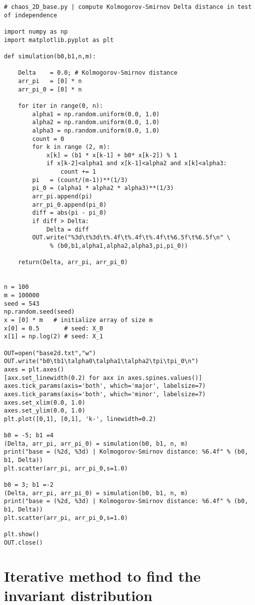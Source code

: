 \documentclass[oneside,10pt]{book}
\begin{document}
\begin{lstlisting}
# chaos_2D_base.py | compute Kolmogorov-Smirnov Delta distance in test of independence

import numpy as np
import matplotlib.pyplot as plt

def simulation(b0,b1,n,m):

    Delta    = 0.0; # Kolmogorov-Smirnov distance
    arr_pi   = [0] * n
    arr_pi_0 = [0] * n
    
    for iter in range(0, n): 
        alpha1 = np.random.uniform(0.0, 1.0)
        alpha2 = np.random.uniform(0.0, 1.0)
        alpha3 = np.random.uniform(0.0, 1.0)
        count = 0
        for k in range (2, m): 
            x[k] = (b1 * x[k-1] + b0* x[k-2]) % 1
            if x[k-2]<alpha1 and x[k-1]<alpha2 and x[k]<alpha3:
                count += 1
        pi   = (count/(m-1))**(1/3)
        pi_0 = (alpha1 * alpha2 * alpha3)**(1/3)
        arr_pi.append(pi)
        arr_pi_0.append(pi_0)
        diff = abs(pi - pi_0)
        if diff > Delta:
            Delta = diff
        OUT.write("%3d\t%3d\t%.4f\t%.4f\t%.4f\t%6.5f\t%6.5f\n" \
             % (b0,b1,alpha1,alpha2,alpha3,pi,pi_0))

    return(Delta, arr_pi, arr_pi_0) 


n = 100
m = 100000
seed = 543
np.random.seed(seed)
x = [0] * m   # initialize array of size m
x[0] = 0.5       # seed: X_0
x[1] = np.log(2) # seed: X_1

OUT=open("base2d.txt","w")
OUT.write("b0\tb1\talpha0\talpha1\talpha2\tpi\tpi_0\n")
axes = plt.axes()
[axx.set_linewidth(0.2) for axx in axes.spines.values()]
axes.tick_params(axis='both', which='major', labelsize=7)
axes.tick_params(axis='both', which='minor', labelsize=7)
axes.set_xlim(0.0, 1.0)
axes.set_ylim(0.0, 1.0)
plt.plot([0,1], [0,1], 'k-', linewidth=0.2)

b0 = -5; b1 =4
(Delta, arr_pi, arr_pi_0) = simulation(b0, b1, n, m)
print("base = (%2d, %3d) | Kolmogorov-Smirnov distance: %6.4f" % (b0, b1, Delta))
plt.scatter(arr_pi, arr_pi_0,s=1.0)

b0 = 3; b1 =-2
(Delta, arr_pi, arr_pi_0) = simulation(b0, b1, n, m)
print("base = (%2d, %3d) | Kolmogorov-Smirnov distance: %6.4f" % (b0, b1, Delta))
plt.scatter(arr_pi, arr_pi_0,s=1.0)

plt.show()
OUT.close()
\end{lstlisting}



\section{Iterative method to find the invariant distribution}
\end{document}
